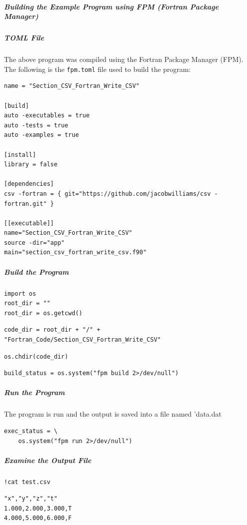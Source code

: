\subparagraph{Building the Example Program using FPM (Fortran Package Manager)}

\subparagraph{TOML File}

The above program was compiled using the Fortran Package Manager (FPM).  The following is the \texttt{fpm.toml} file used to build the program:

\begin{verbatim}
name = "Section_CSV_Fortran_Write_CSV"

[build]
auto -executables = true
auto -tests = true
auto -examples = true

[install]
library = false

[dependencies]
csv -fortran = { git="https://github.com/jacobwilliams/csv -fortran.git" }

[[executable]]
name="Section_CSV_Fortran_Write_CSV"
source -dir="app"
main="section_csv_fortran_write_csv.f90"
\end{verbatim}

\subparagraph{Build the Program}

\begin{verbatim}
import os
root_dir = ""
root_dir = os.getcwd()
\end{verbatim}

\begin{verbatim}
code_dir = root_dir + "/" + "Fortran_Code/Section_CSV_Fortran_Write_CSV"
\end{verbatim}

\begin{verbatim}
os.chdir(code_dir)
\end{verbatim}

\begin{verbatim}
build_status = os.system("fpm build 2>/dev/null")
\end{verbatim}

\subparagraph{Run the Program}

The program is run and the output is saved into a file named 'data.dat

\begin{verbatim}
exec_status = \
    os.system("fpm run 2>/dev/null")
\end{verbatim}

\subparagraph{Examine the Output File}

\begin{verbatim}
!cat test.csv
\end{verbatim}

\begin{verbatim}
"x","y","z","t"
1.000,2.000,3.000,T
4.000,5.000,6.000,F
\end{verbatim}